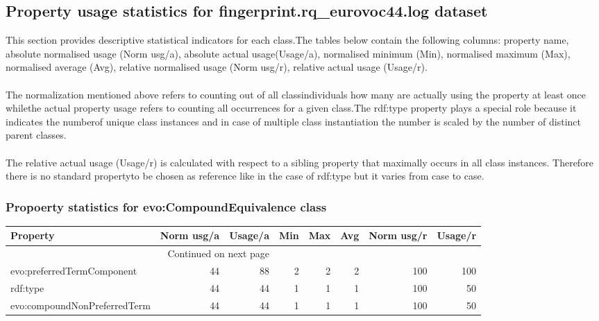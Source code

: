 \documentclass[10pt,a4paper,titlepage,final]{article}
\begin{document}
\subsection{Property usage statistics for fingerprint.rq\_eurovoc44.log dataset}
This section provides descriptive statistical indicators for each class.The tables below contain the following columns: property name, absolute normalised usage (Norm usg/a), absolute actual usage(Usage/a), normalised minimum (Min), normalised maximum (Max), normalised average (Avg), relative normalised usage (Norm usg/r), relative actual usage (Usage/r).\\\\The normalization mentioned above refers to counting out of all classindividuals how many are actually using the property at least once whilethe actual property usage refers to counting all occurrences for a given class.The rdf:type property plays a special role because it indicates the numberof unique class instances and in case of multiple class instantiation the number is scaled by the  number of distinct parent classes. \\\\The relative actual usage (Usage/r) is calculated with respect to a sibling property that maximally occurs in all class instances. Therefore there is no standard propertyto be chosen as reference like in the case of rdf:type but it varies from case to case.
\subsubsection{Propoerty statistics for evo:CompoundEquivalence class}
\begin{longtable}{lrrrrrrr}
\toprule
                     Property &  Norm usg/a &  Usage/a &  Min &  Max &  Avg &  Norm usg/r &  Usage/r \\
\midrule
\endhead
\midrule
\multicolumn{3}{r}{{Continued on next page}} \\
\midrule
\endfoot

\bottomrule
\endlastfoot
   evo:preferredTermComponent &          44 &       88 &    2 &    2 &    2 &         100 &      100 \\
                     rdf:type &          44 &       44 &    1 &    1 &    1 &         100 &       50 \\
 evo:compoundNonPreferredTerm &          44 &       44 &    1 &    1 &    1 &         100 &       50 \\
\end{longtable}
\end{document}
